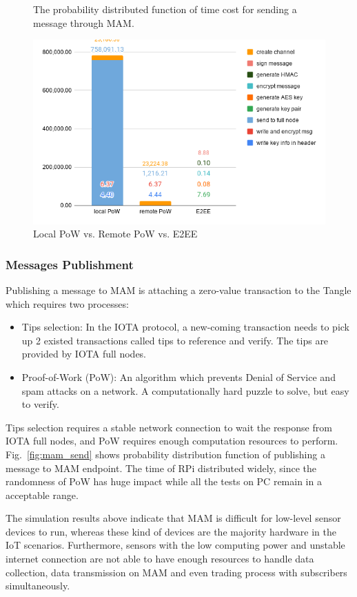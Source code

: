 \documentclass[conference]{IEEEtran}
\begin{document}
\begin{figure}[!htb]
  \caption{The probability distributed function of time cost for sending a message through MAM.}\label{fig:mam_send}
\endminipage\hfill
{}%
  \includegraphics[width=\linewidth]{rpi3_pow}
  \caption{Local PoW vs. Remote PoW vs. E2EE}\label{fig:rpi3_pow}
\endminipage
\end{figure}

\subsubsection{Messages Publishment}
Publishing a message to MAM is attaching a zero-value transaction to the Tangle which requires two processes:
\begin{itemize}
	\item	Tips selection: In the IOTA protocol, a new-coming transaction needs to pick up 2 existed transactions called tips to reference and verify. The tips are provided by IOTA full nodes.
	\item	Proof-of-Work (PoW): An algorithm which prevents Denial of Service and spam attacks on a network. A computationally hard puzzle to solve, but easy to verify.
\end{itemize}

Tips selection requires a stable network connection to wait the response from IOTA full nodes, and PoW requires enough computation resources to perform. Fig.~\ref{fig:mam_send} shows probability distribution function of publishing a message to MAM endpoint. The time of RPi distributed widely, since the randomness of PoW has huge impact while all the tests on PC remain in a acceptable range.

The simulation results above indicate that MAM is difficult for low-level sensor devices to run, whereas these kind of devices are the majority hardware in the IoT scenarios. Furthermore, sensors with the low computing power and unstable internet connection are not able to have enough resources to handle data collection, data transmission on MAM and even trading process with subscribers simultaneously. 
\end{document}
